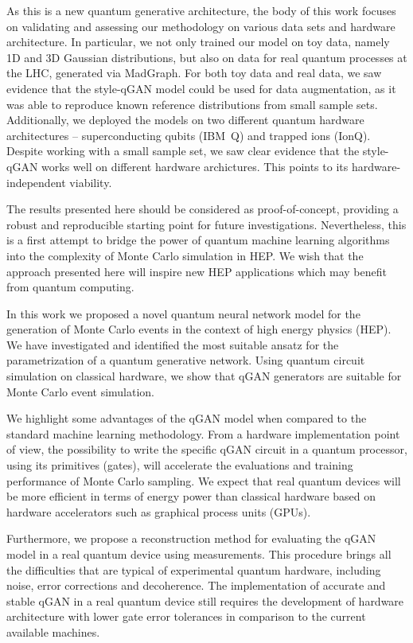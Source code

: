 \documentclass[twocolumn,preprintnumbers,superscriptaddress]{revtex4-2}
\begin{document}
{As this is a new quantum generative architecture, the body of this work focuses on validating and assessing our methodology on various data sets and hardware architecture. In particular, we not only trained our model on toy data, namely 1D and 3D Gaussian distributions, but also on data for real quantum processes at the LHC, generated via MadGraph. For both toy data and real data, we saw evidence that the style-qGAN model could be used for data augmentation, as it was able to reproduce known reference distributions from small sample sets. Additionally, we deployed the models on two different quantum hardware architectures -- superconducting qubits (IBM~Q) and trapped ions (IonQ). Despite working with a small sample set, we saw clear evidence that the style-qGAN works well on different hardware archictures. This points to its hardware-independent viability. 

The results presented here should be considered as proof-of-concept, providing a robust and reproducible starting point for future investigations. Nevertheless, this is a first attempt to bridge the power of quantum machine learning algorithms into the complexity of Monte Carlo simulation in HEP. We wish that the approach presented here will inspire new HEP applications which may benefit from quantum computing.}

In this work we proposed a novel quantum neural network model for the generation
of Monte Carlo events in the context of high energy physics (HEP). We have
investigated and identified the most suitable ansatz for the parametrization of
a quantum generative network. Using quantum circuit simulation on classical
hardware, we show that qGAN generators are suitable for Monte Carlo event
simulation.

We highlight some advantages of the qGAN model when compared to the standard
machine learning methodology. From a hardware implementation point of view, the
possibility to write the specific qGAN circuit in a quantum processor, using its
primitives (gates), will accelerate the evaluations and training performance of
Monte Carlo sampling. We expect that real quantum devices will be more efficient
in terms of energy power than classical hardware based on hardware accelerators
such as graphical process units (GPUs).

Furthermore, we propose a reconstruction method for evaluating the qGAN model in
a real quantum device using measurements. This procedure brings all the
difficulties that are typical of experimental quantum hardware, including noise,
error corrections and decoherence. The implementation of accurate and stable
qGAN in a real quantum device still requires the development of hardware
architecture with lower gate error tolerances in comparison to the current
available machines.
\end{document}
